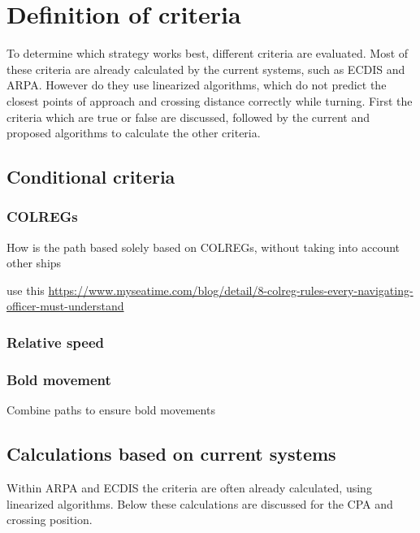 \chapter{Definition of criteria}
To determine which strategy works best, different criteria are evaluated. Most of these criteria are already calculated by the current systems, such as \ac{ECDIS} and \ac{ARPA}. However do they use linearized algorithms, which do not predict the closest points of approach and crossing distance correctly while turning. First the criteria which are true or false are discussed, followed by the current and proposed algorithms to calculate the other criteria.

\section{Conditional criteria}

\subsection{COLREGs}
How is the path based solely based on COLREGs, without taking into account other ships

use this \url{https://www.myseatime.com/blog/detail/8-colreg-rules-every-navigating-officer-must-understand}

\subsection{Relative speed}

\subsection{Bold movement}
Combine paths to ensure bold movements


\section{Calculations based on current systems}
Within \ac{ARPA} and \ac{ECDIS} the criteria are often already calculated, using linearized algorithms. Below these calculations are discussed for the \ac{CPA} and crossing position.

